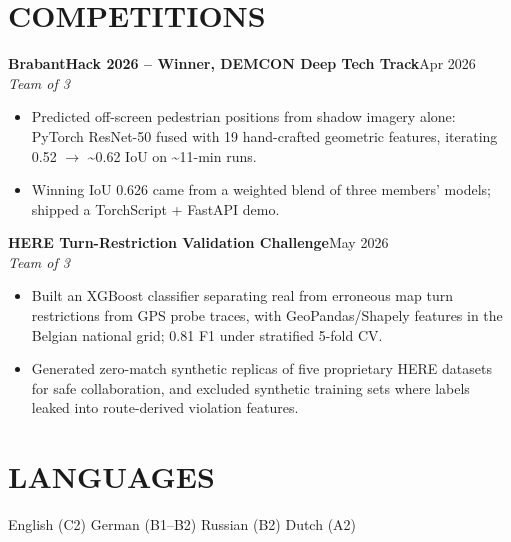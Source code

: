 \documentclass[10pt,a4paper]{article}
\newcommand{\sep}{\hspace{5pt}\textperiodcentered\hspace{5pt}}
\newcommand{\entry}[4]{%
  \textbf{#1}\hfill #2\\
  \textit{#3}\hfill \textit{#4}\par\vspace{1pt}}
\begin{document}
\section*{COMPETITIONS}

\entry{BrabantHack 2026 -- Winner, DEMCON Deep Tech Track}{Apr 2026}{Team of 3}{}
\begin{itemize}
  \item Predicted off-screen pedestrian positions from shadow imagery alone:
        PyTorch ResNet-50 fused with 19 hand-crafted geometric features, iterating
        0.52 $\rightarrow$ \textasciitilde{}0.62 IoU on \textasciitilde{}11-min runs.
  \item Winning IoU 0.626 came from a weighted blend of three members' models;
        shipped a TorchScript + FastAPI demo.
\end{itemize}

\entry{HERE Turn-Restriction Validation Challenge}{May 2026}{Team of 3}{}
\begin{itemize}
  \item Built an XGBoost classifier separating real from erroneous map turn
        restrictions from GPS probe traces, with GeoPandas/Shapely features in the
        Belgian national grid; 0.81 F1 under stratified 5-fold CV.
  \item Generated zero-match synthetic replicas of five proprietary HERE datasets
        for safe collaboration, and excluded synthetic training sets where labels
        leaked into route-derived violation features.
\end{itemize}

\section*{LANGUAGES}
English (C2) \sep German (B1--B2) \sep Russian (B2) \sep Dutch (A2)
\end{document}
